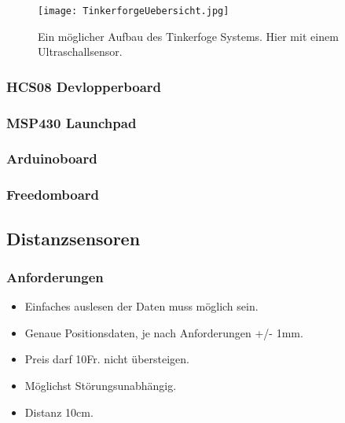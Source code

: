 \begin{figure}[ht]
	\centering									
	\texttt{[image: TinkerforgeUebersicht.jpg]}
	\caption{Ein möglicher Aufbau des Tinkerfoge Systems. Hier mit einem Ultraschallsensor.}
	\label{fig1}
\end{figure}

\subsubsection{HCS08 Devlopperboard}

\subsubsection{MSP430 Launchpad}
\subsubsection{Arduinoboard}
\subsubsection{Freedomboard}

\subsection*{Distanzsensoren}
\subsubsection{Anforderungen}
\begin{itemize}
\item Einfaches auslesen der Daten muss möglich sein.
\item Genaue Positionsdaten, je nach Anforderungen +/- 1mm.
\item Preis darf 10Fr. nicht übersteigen.
\item Möglichst Störungsunabhängig.
\item Distanz 10cm.
\end{itemize}


